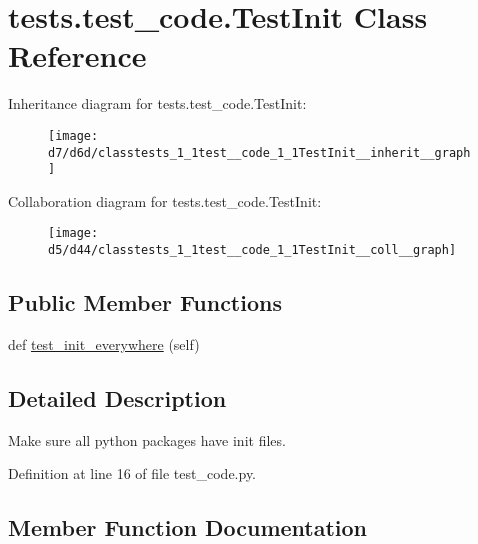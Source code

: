 \hypertarget{classtests_1_1test__code_1_1TestInit}{}\section{tests.\+test\+\_\+code.\+Test\+Init Class Reference}
\label{classtests_1_1test__code_1_1TestInit}


Inheritance diagram for tests.\+test\+\_\+code.\+Test\+Init\+:\nopagebreak
\begin{figure}[H]
\begin{center}
\leavevmode
\texttt{[image: d7/d6d/classtests\_1\_1test\_\_code\_1\_1TestInit\_\_inherit\_\_graph]}
\end{center}
\end{figure}


Collaboration diagram for tests.\+test\+\_\+code.\+Test\+Init\+:\nopagebreak
\begin{figure}[H]
\begin{center}
\leavevmode
\texttt{[image: d5/d44/classtests\_1\_1test\_\_code\_1\_1TestInit\_\_coll\_\_graph]}
\end{center}
\end{figure}
\subsection*{Public Member Functions}
\begin{DoxyCompactItemize}
\item 
def \hyperlink{classtests_1_1test__code_1_1TestInit_a8b97f4f48a8f21267c07578969c5612f}{test\+\_\+init\+\_\+everywhere} (self)
\end{DoxyCompactItemize}


\subsection{Detailed Description}
\begin{DoxyVerb}Make sure all python packages have init files.
\end{DoxyVerb}
 

Definition at line 16 of file test\+\_\+code.\+py.



\subsection{Member Function Documentation}
\mbox{\label{classtests_1_1test__code_1_1TestInit_a8b97f4f48a8f21267c07578969c5612f}} 
